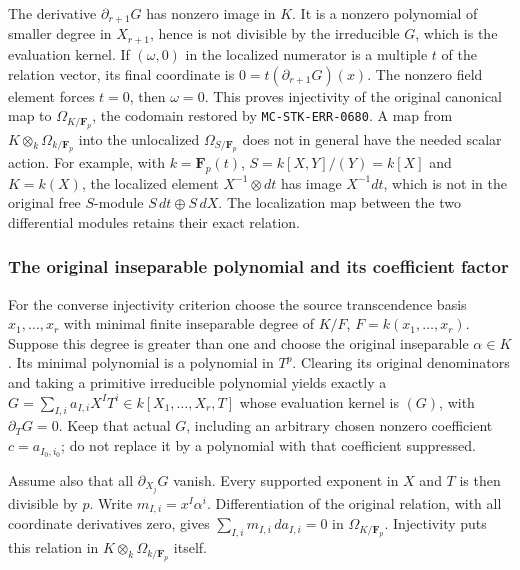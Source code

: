 The derivative \(\partial_{r+1}G\) has nonzero image in \(K\). It is a nonzero polynomial of smaller degree in \(X_{r+1}\), hence is not divisible by the irreducible \(G\), which is the evaluation kernel. If \((\omega,0)\) in the localized numerator is a multiple \(t\) of the relation vector, its final coordinate is \(0=t(\partial_{r+1}G)(x)\). The nonzero field element forces \(t=0\), then \(\omega=0\). This proves injectivity of the original canonical map to \(\Omega_{K/\mathbf F_p}\), the codomain restored by \texttt{MC-STK-ERR-0680}. A map from \(K\otimes_k\Omega_{k/\mathbf F_p}\) into the unlocalized \(\Omega_{S/\mathbf F_p}\) does not in general have the needed scalar action. For example, with \(k=\mathbf F_p(t)\), \(S=k[X,Y]/(Y)=k[X]\) and \(K=k(X)\), the localized element \(X^{-1}\otimes dt\) has image \(X^{-1}dt\), which is not in the original free \(S\)-module \(S\,dt\oplus S\,dX\). The localization map between the two differential modules retains their exact relation.

\subsubsection{The original inseparable polynomial and its coefficient factor}\label{the-original-inseparable-polynomial-and-its-coefficient-factor}

For the converse injectivity criterion choose the source transcendence basis \(x_1,\ldots,x_r\) with minimal finite inseparable degree of \(K/F\), \(F=k(x_1,\ldots,x_r)\). Suppose this degree is greater than one and choose the original inseparable \(\alpha\in K\). Its minimal polynomial is a polynomial in \(T^p\). Clearing its original denominators and taking a primitive irreducible polynomial yields exactly a \(G=\sum_{I,i} a_{I,i}X^IT^i\in k[X_1,\ldots,X_r,T]\) whose evaluation kernel is \((G)\), with \(\partial_TG=0\). Keep that actual \(G\), including an arbitrary chosen nonzero coefficient \(c=a_{I_0,i_0}\); do not replace it by a polynomial with that coefficient suppressed.

Assume also that all \(\partial_{X_j}G\) vanish. Every supported exponent in \(X\) and \(T\) is then divisible by \(p\). Write \(m_{I,i}=x^I\alpha^i\). Differentiation of the original relation, with all coordinate derivatives zero, gives \(\sum_{I,i}m_{I,i}\,da_{I,i}=0\) in \(\Omega_{K/\mathbf F_p}\). Injectivity puts this relation in \(K\otimes_k\Omega_{k/\mathbf F_p}\) itself.

